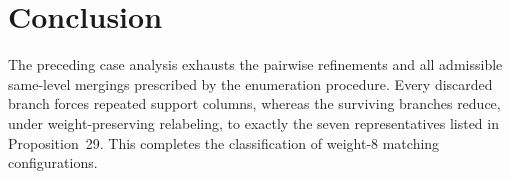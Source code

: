 \documentclass[11pt]{article}
\begin{document}
\section{Conclusion}
The preceding case analysis exhausts the pairwise refinements and all admissible same-level mergings prescribed by the enumeration procedure. Every discarded branch forces repeated support columns, whereas the surviving branches reduce, under weight-preserving relabeling, to exactly the seven representatives listed in Proposition~29. This completes the classification of weight-$8$ matching configurations.
\end{document}
